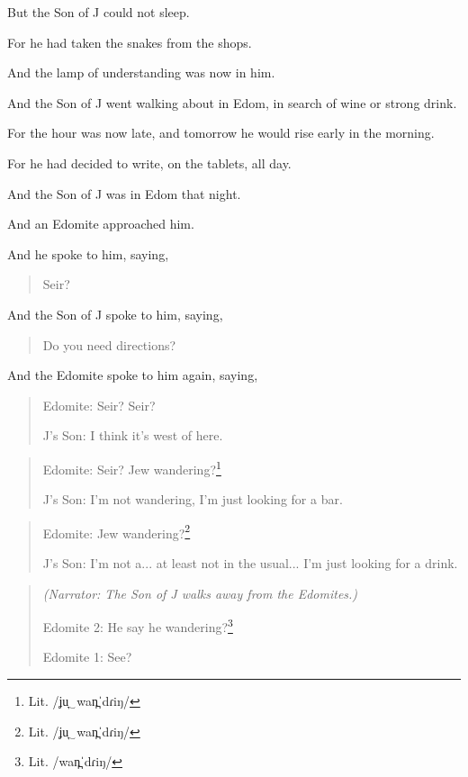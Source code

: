 
\Sentence
{ \hX{} }
{ \eX{} }
{ But the Son of J could not sleep.

  For he had taken the snakes from the shops.

  And the lamp of understanding was now in him. }

\Sentence
{ \hX{} }
{ \eX{} }
{
And the Son of J went walking about in Edom, in search of wine or strong drink.

  For the hour was now late, and tomorrow he would rise early in the morning.
}

\Sentence
{ \hX{} }
{ \eX{} }
{
For he had decided to write, on the tablets, all day.
}

\Sentence
{ \hX{} }
{ \eX{} }
{
And the Son of J was in Edom that night.

  And an Edomite approached him.
}

\Sentence
{ \hX{} }
{ \eX{} }
{
And he spoke to him, saying,
  \begin{quote}Seir?\end{quote}
  And the Son of J spoke to him, saying,
  \begin{quote}Do you need directions?\end{quote}
}

\Sentence
{ \hX{} }
{ \eX{} }
{
And the Edomite spoke to him again, saying,
\begin{quote}
Edomite: Seir? Seir?

    J's Son: I think it's west of here.
\end{quote}
}

\Sentence
{ \hX{} }
{ \eX{} }
{
\begin{quote}
    Edomite: Seir? Jew wandering?\footnote{Lit. /ʝu̞‿wan̪ˈdɾiŋ/}

    J's Son: I'm not wandering, I'm just looking for a bar.
\end{quote}
}

\Sentence
{ \hX{} }
{ \eX{} }
{
\begin{quote}
    Edomite: Jew wandering?\footnote{Lit. /ʝu̞‿wan̪ˈdɾiŋ/}

    J's Son: I'm not a... at least not in the usual...  I'm just looking for a drink.
\end{quote}
}

\Sentence
{ \hX{} }
{ \eX{} }
{
\begin{quote}
    \textsl{(Narrator: The Son of J walks away from the Edomites.)}

    Edomite 2: He say he wandering?\footnote{Lit. /wan̪ˈdɾiŋ/}

    Edomite 1: See?
\end{quote}
}

